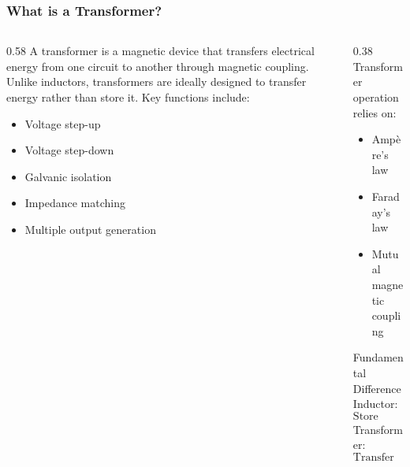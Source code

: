\begin{frame}
    \frametitle{What is a Transformer?}
    \begin{columns}
        \begin{column}{0.58\textwidth}
            A transformer is a magnetic device that transfers electrical energy from one circuit to another through magnetic coupling.
            \vspace{0.15cm}
            Unlike inductors, transformers are ideally designed to transfer energy rather than store it.
            \vspace{0.15cm}
            Key functions include:
            \begin{itemize}
                \item Voltage step-up
                \item Voltage step-down
                \item Galvanic isolation
                \item Impedance matching
                \item Multiple output generation
            \end{itemize}
        \end{column}
        \begin{column}{0.38\textwidth}
            Transformer operation relies on:
            \begin{itemize}
                \item Amp\`ere's law
                \item Faraday's law
                \item Mutual magnetic coupling
            \end{itemize}
            \begin{block}{Fundamental Difference}
                Inductor:
                \[
                    \text{Store energy}
                \]
                \vspace{0.15cm}
                Transformer:
                \[
                    \text{Transfer energy}
                \]
            \end{block}
        \end{column}
    \end{columns}
\end{frame}


